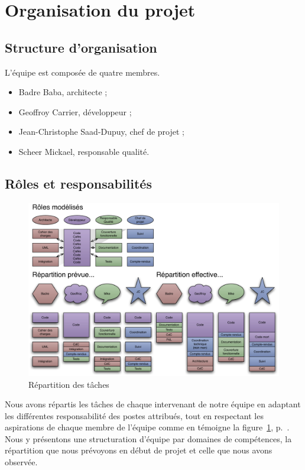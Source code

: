 
\section{Organisation du projet}
\subsection{Structure d’organisation}
L'équipe est composée de quatre membres.
\begin{itemize}
	\item Badre Baba, architecte ;
	\item Geoffroy Carrier, développeur ;
	\item Jean-Christophe Saad-Dupuy, chef de projet ;
	\item Scheer Mickael, responsable qualité.
\end{itemize}

\subsection{Rôles et responsabilités}
\begin{figure}[thbp]
	\centering
		\includegraphics[width=20cm,angle=90]{../diagrammes/repartition_taches.pdf}
	\caption{Répartition des tâches}
	\label{fig:repartition}
\end{figure}

Nous avons répartis les tâches de chaque intervenant de notre équipe en adaptant les différentes responsabilité des postes attribués, tout en respectant les aspirations de chaque membre de l'équipe comme en témoigne la figure~\ref{fig:repartition},
p.~\pageref{fig:repartition}. Nous y présentons une structuration d'équipe par domaines de compétences, la répartition que nous prévoyons en début de projet et celle que nous avons observée.